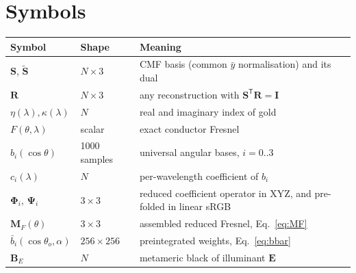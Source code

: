\documentclass[11pt,a4paper]{article}
\newcommand{\mS}{\mathbf{S}}
\newcommand{\mSd}{\tilde{\mathbf{S}}}
\newcommand{\mR}{\mathbf{R}}
\newcommand{\mPhi}{\boldsymbol{\Phi}}
\newcommand{\mPsi}{\boldsymbol{\Psi}}
\newcommand{\mM}{\mathbf{M}}
\newcommand{\mI}{\mathbf{I}}
\newcommand{\mB}{\mathbf{B}}
\newcommand{\vE}{\mathbf{E}}
\newcommand{\lam}{\lambda}
\newcommand{\transp}{^{\mathsf{T}}}
\begin{document}
\section{Symbols}

\begin{table}[h]\centering\small
\begin{tabular}{@{}lll@{}}
\toprule
Symbol & Shape & Meaning \\
\midrule
$\mS$, $\mSd$          & $N\times3$    & CMF basis (common $\bar y$ normalisation) and its dual \\
$\mR$                  & $N\times3$    & any reconstruction with $\mS\transp\mR=\mI$ \\
$\eta(\lam),\kappa(\lam)$ & $N$        & real and imaginary index of gold \\
$F(\theta,\lam)$       & scalar        & exact conductor Fresnel \\
$b_i(\cos\theta)$      & 1000 samples  & universal angular bases, $i=0..3$ \\
$c_i(\lam)$            & $N$           & per-wavelength coefficient of $b_i$ \\
$\mPhi_i$, $\mPsi_i$   & $3\times3$    & reduced coefficient operator in XYZ, and pre-folded in linear sRGB \\
$\mM_F(\theta)$        & $3\times3$    & assembled reduced Fresnel, Eq.~\eqref{eq:MF} \\
$\bar b_i(\cos\theta_o,\alpha)$ & $256\times256$ & preintegrated weights, Eq.~\eqref{eq:bbar} \\
$\mB_E$                & $N$           & metameric black of illuminant $\vE$ \\
\bottomrule
\end{tabular}
\end{table}
\end{document}
